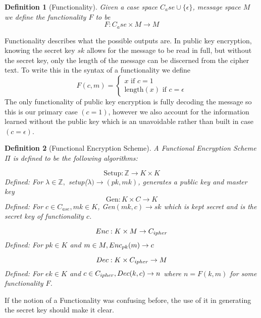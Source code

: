 \documentclass[12pt,twoside]{reedthesis}
\newtheorem{definition}{Definition}
\begin{document}
\begin{definition}[Functionality]
Given a case space $C_ase \cup \{\epsilon\}$, message space $M$ we define the functionality $F$ to be 
$$F:C_ase \times M \rightarrow M$$
\end{definition}

\par Functionality describes what the possible outputs are. In public key encryption, knowing the secret key $sk$ allows for the message to be read in full, but without the secret key, only the length of the message can be discerned from the cipher text. To write this in the syntax of a functionality we define
$$
F(c,m) = 
\begin{cases}
 x \text{ if } c = 1 \\
\text{length}(x) \text{ if } c = \epsilon
\end{cases}
$$
The only functionality of public key encryption is fully decoding the message so this is our primary case $(c = 1)$, however we also account for the information learned without the public key which is an unavoidable rather than built in case $(c = \epsilon)$.


\newcommand{\Z}[0]{\mathbb{Z}}
\begin{definition}[Functional Encryption Scheme]
A Functional Encryption Scheme $\Pi$ is defined to be the following algorithms:

$$\text{Setup}: \Z \rightarrow K \times K$$
Defined: For $\lambda \in \Z,$ setup($\lambda) \rightarrow (pk,mk)$, generates a public key and master key
$$\text{Gen}: K \times C \rightarrow K $$
Defined: For $c\in C_{ase}, mk \in K$, Gen$(mk,c) \rightarrow sk$ which is kept secret and is the secret key of functionality $c$.

$$Enc: K \times M \rightarrow C_{ipher}$$
Defined: For $pk\in K$ and $m \in M, Enc_{pk}(m) \rightarrow c$

$$Dec:K \times C_{ipher} \rightarrow M$$
Defined: For $ek \in K$ and $c \in C_{ipher}, Dec(k,c) \rightarrow n$ where $n = F(k,m)$ for some functionality $F$. 
\end{definition}


If the notion of a Functionality was confusing before, the use of it in generating the secret key should make it clear.
\end{document}
